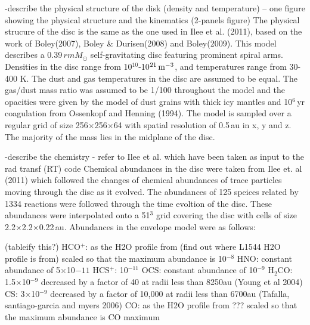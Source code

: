 \documentclass[useAMS,usenatbib]{mn2e}
\begin{document}
-describe the physical structure of the disk (density and temperature) -- one figure showing the physical structure and the kinematics (2-panels figure)
The physical strucure of the disc is the same as the one used in Ilee et al. (2011), based on the work of Boley(2007), Boley \& Durisen(2008) and Boley(2009). This model describes a 0.39$\,rm{M}_\odot$ self-gravitating disc featuring prominent spiral arms. Densities in the disc range from 10$^{10}$-10$^{21}\,\rm{m}^{-3}$, and temperatures range from 30-400 K. The dust and gas temperatures in the disc are assumed to be equal. The gas/dust mass ratio was assumed to be 1/100 throughout the model and the opacities were given by the model of dust grains with thick icy mantles and 10$^6\,$yr coagulation from Ossenkopf and Henning (1994). The model is sampled over a regular grid of size 256$\times$256$\times$64 with spatial resolution of 0.5$\,$au in x, y and z. The majority of the mass lies in the midplane of the disc.\newline

-describe the chemistry  - refer to Ilee et al. which have been taken as input to the rad transf (RT) code
Chemical abundances in the disc were taken from Ilee et. al (2011) which followed the changes of chemical abundances of trace particles moving through the disc as it evolved. The abundances of 125 speices related by 1334 reactions were followed through the time evoltion of the disc. These abundances were interpolated onto a 51$^3$ grid covering the disc with cells of size 2.2$\times$2.2$\times$0.22$\,$au. Abundances in the envelope model were as follows:\newline

(tableify this?)\newline
HCO$^+$: as the H2O profile from (find out where L1544 H2O profile is from) scaled so that the maximum abundance is 10$^{-8}$\newline
HNO: constant abundance of 5$\times$10${-11}$\newline
HCS$^+$: 10$^{-11}$\newline
OCS: constant abundance of 10$^{-9}$\newline
H$_2$CO: 1.5$\times$10$^{-9}$ decreased by a factor of 40 at radii less than 8250au (Young et al 2004)\newline
CS:  3$\times$10$^{-9}$ decreased by a factor of 10,000 at radii less than 6700au (Tafalla, santiago-garcia and myers 2006)\newline
CO: as the H2O profile from ??? scaled so that the maximum abundance is CO maximum\newline\
\end{document}
